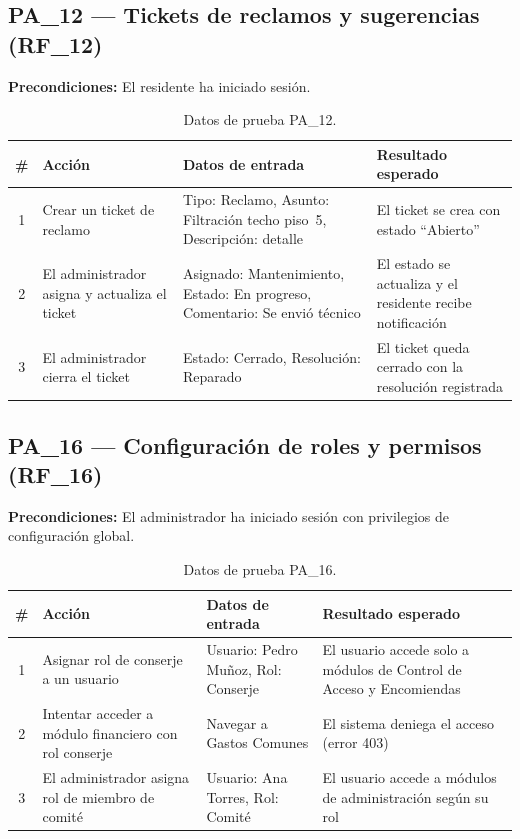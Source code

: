 \subsection{PA\_12 — Tickets de reclamos y sugerencias (RF\_12)}

\textbf{Precondiciones:} El residente ha iniciado sesión.

\begin{table}[H]
\centering
\small
\begin{tabular}{|c|p{}|p{}|p{}|}
\hline
\textbf{\#} & \textbf{Acción} & \textbf{Datos de entrada} & \textbf{Resultado esperado} \\ \hline
1 & Crear un ticket de reclamo & Tipo: Reclamo, Asunto: Filtración techo piso~5, Descripción: detalle & El ticket se crea con estado ``Abierto'' \\ \hline
2 & El administrador asigna y actualiza el ticket & Asignado: Mantenimiento, Estado: En progreso, Comentario: Se envió técnico & El estado se actualiza y el residente recibe notificación \\ \hline
3 & El administrador cierra el ticket & Estado: Cerrado, Resolución: Reparado & El ticket queda cerrado con la resolución registrada \\ \hline
\end{tabular}
\caption{Datos de prueba PA\_12.}
\end{table}

\subsection{PA\_16 — Configuración de roles y permisos (RF\_16)}

\textbf{Precondiciones:} El administrador ha iniciado sesión con privilegios de configuración global.

\begin{table}[H]
\centering
\small
\begin{tabular}{|c|p{}|p{}|p{}|}
\hline
\textbf{\#} & \textbf{Acción} & \textbf{Datos de entrada} & \textbf{Resultado esperado} \\ \hline
1 & Asignar rol de conserje a un usuario & Usuario: Pedro Muñoz, Rol: Conserje & El usuario accede solo a módulos de Control de Acceso y Encomiendas \\ \hline
2 & Intentar acceder a módulo financiero con rol conserje & Navegar a Gastos Comunes & El sistema deniega el acceso (error 403) \\ \hline
3 & El administrador asigna rol de miembro de comité & Usuario: Ana Torres, Rol: Comité & El usuario accede a módulos de administración según su rol \\ \hline
\end{tabular}
\caption{Datos de prueba PA\_16.}
\end{table}

